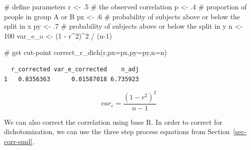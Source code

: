 \documentclass[
  letterpaper,
  DIV=11,
  numbers=noendperiod]{scrreprt}
\newenvironment{Shaded}{\begin{snugshade}}{\end{snugshade}}
\newcommand{\AttributeTok}[1]{\textcolor[rgb]{0.40,0.45,0.13}{#1}}
\newcommand{\CommentTok}[1]{\textcolor[rgb]{0.37,0.37,0.37}{#1}}
\newcommand{\DecValTok}[1]{\textcolor[rgb]{0.68,0.00,0.00}{#1}}
\newcommand{\FunctionTok}[1]{\textcolor[rgb]{0.28,0.35,0.67}{#1}}
\newcommand{\NormalTok}[1]{\textcolor[rgb]{0.00,0.23,0.31}{#1}}
\newcommand{\OtherTok}[1]{\textcolor[rgb]{0.00,0.23,0.31}{#1}}
\newcommand{\SpecialCharTok}[1]{\textcolor[rgb]{0.37,0.37,0.37}{#1}}
\begin{document}
\begin{Shaded}
\begin{Highlighting}[]
\CommentTok{\# define parameters}
\NormalTok{r }\OtherTok{\textless{}{-}}\NormalTok{ .}\DecValTok{5} \CommentTok{\# the observed correlation}
\NormalTok{p }\OtherTok{\textless{}{-}}\NormalTok{ .}\DecValTok{4}  \CommentTok{\# proportion of people in group A or B}
\NormalTok{px }\OtherTok{\textless{}{-}}\NormalTok{ .}\DecValTok{6} \CommentTok{\# probability of subjects above or below the split in x}
\NormalTok{py }\OtherTok{\textless{}{-}}\NormalTok{ .}\DecValTok{7} \CommentTok{\# probability of subjects above or below the split in y}
\NormalTok{n }\OtherTok{\textless{}{-}} \DecValTok{100}
\NormalTok{var\_e\_o }\OtherTok{\textless{}{-}}\NormalTok{ (}\DecValTok{1} \SpecialCharTok{{-}}\NormalTok{ r}\SpecialCharTok{\^{}}\DecValTok{2}\NormalTok{)}\SpecialCharTok{\^{}}\DecValTok{2} \SpecialCharTok{/}\NormalTok{ (n}\DecValTok{{-}1}\NormalTok{)}

\CommentTok{\# get cut{-}point}
\FunctionTok{correct\_r\_dich}\NormalTok{(r,}\AttributeTok{px=}\NormalTok{px,}\AttributeTok{py=}\NormalTok{py,}\AttributeTok{n=}\NormalTok{n)}
\end{Highlighting}
\end{Shaded}

\begin{verbatim}
  r_corrected var_e_corrected    n_adj
1   0.8356363      0.01587018 6.735923
\end{verbatim}

\[
var_{e}=\frac{(1-r^{2})^{2}}{n-1}
\]

We can also correct the correlation using base R. In order to correct
for dichotomization, we can use the three step process equations from
Section~\ref{sec-corr-smd}.
\end{document}
